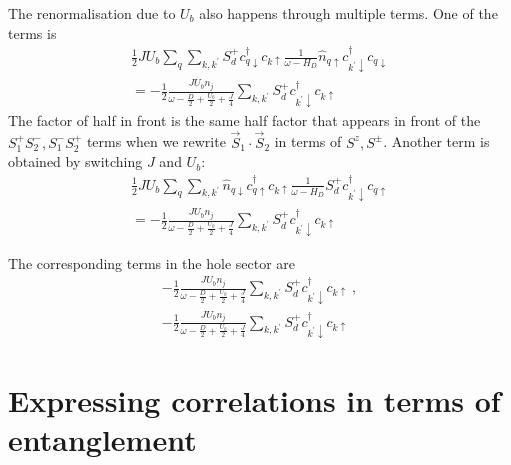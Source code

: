 \documentclass[reprint,superscriptaddress,floatfix]{revtex4-2}
\begin{document}
The renormalisation due to \(U_b\) also happens through multiple terms. One of the terms is
\begin{equation}\begin{aligned}
	\frac{1}{2} J U_b \sum_{q} \sum_{k,k^\prime} S_d^+ c^\dagger_{q \downarrow} c_{k \uparrow} \frac{1}{\omega - H_D} \hat n_{q \uparrow} c^\dagger_{k^\prime \downarrow}c_{q \downarrow} \\
	= -\frac{1}{2}\frac{J U_b n_j}{\omega - \frac{D}{2} + \frac{U_b}{2} + \frac{J}{4}} \sum_{k,k^\prime} S_d^+ c^\dagger_{k^\prime \downarrow} c_{k \uparrow}
\end{aligned}\end{equation}
The factor of half in front is the same half factor that appears in front of the \(S_1^+ S_2^-, S_1^-S_2^+\) terms when we rewrite \(\vec{S}_1\cdot\vec{S}_2\) in terms of \(S^z, S^\pm\). Another term is obtained by switching \(J\) and \(U_b\):
\begin{equation}\begin{aligned}
	\frac{1}{2} J U_b \sum_{q} \sum_{k,k^\prime} \hat n_{q \downarrow} c^\dagger_{q \uparrow} c_{k \uparrow} \frac{1}{\omega - H_D}S_d^+ c^\dagger_{k^\prime \downarrow} c_{q \uparrow} \\
	= -\frac{1}{2}\frac{J U_b n_j}{\omega - \frac{D}{2} + \frac{U_b}{2} + \frac{J}{4}} \sum_{k,k^\prime} S_d^+ c^\dagger_{k^\prime \downarrow} c_{k \uparrow}
\end{aligned}\end{equation}

The corresponding terms in the hole sector are
\begin{equation}\begin{aligned}
	-\frac{1}{2}\frac{J U_b n_j}{\omega - \frac{D}{2} + \frac{U_b}{2} + \frac{J}{4}} \sum_{k,k^\prime} S_d^+ c^\dagger_{k^\prime \downarrow} c_{k \uparrow}~,\\
	-\frac{1}{2}\frac{J U_b n_j}{\omega - \frac{D}{2} + \frac{U_b}{2} + \frac{J}{4}} \sum_{k,k^\prime} S_d^+ c^\dagger_{k^\prime \downarrow} c_{k \uparrow}
\end{aligned}\end{equation}

\section{Expressing correlations in terms of entanglement}
\label{general-ent}
\end{document}
